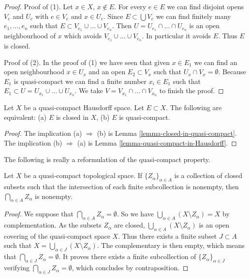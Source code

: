 \begin{proof}
Proof of (1). Let $x \in X$, $x \not \in E$.
For every $e \in E$ we can find disjoint opens $V_e$ and $U_e$
with $e \in V_e$ and $x \in U_e$. Since $E \subset \bigcup V_e$
we can find finitely many $e_1, \ldots, e_n$ such that
$E \subset V_{e_1} \cup \ldots \cup V_{e_n}$. Then
$U = U_{e_1} \cap \ldots \cap U_{e_n}$ is an open neighbourhood
of $x$ which avoids $V_{e_1} \cup \ldots \cup V_{e_n}$. In particular
it avoids $E$. Thus $E$ is closed.

\medskip\noindent
Proof of (2). In the proof of (1) we have seen that given $x \in E_1$
we can find an open neighbourhood $x \in U_x$ and an open
$E_2 \subset V_x$ such that $U_x \cap V_x = \emptyset$. Because
$E_1$ is quasi-compact we can find a finite number $x_i \in E_1$
such that $E_1 \subset U = U_{x_1} \cup \ldots \cup U_{x_n}$.
We take $V = V_{x_1} \cap \ldots \cap V_{x_n}$ to finish the proof.
\end{proof}

\begin{lemma}
\label{lemma-closed-in-compact}
Let $X$ be a quasi-compact Hausdorff space. Let $E \subset X$.
The following are equivalent: (a) $E$ is closed in $X$, (b)
$E$ is quasi-compact.
\end{lemma}

\begin{proof}
The implication (a) $\Rightarrow$ (b) is
Lemma \ref{lemma-closed-in-quasi-compact}.
The implication (b) $\Rightarrow$ (a) is
Lemma \ref{lemma-quasi-compact-in-Hausdorff}.
\end{proof}

\noindent
The following is really a reformulation of the
quasi-compact property.

\begin{lemma}
\label{lemma-intersection-closed-in-quasi-compact}
Let $X$ be a quasi-compact topological space.
If $\{Z_\alpha\}_{\alpha \in A}$ is a collection of closed subsets
such that the intersection of each finite subcollection
is nonempty, then $\bigcap_{\alpha \in A} Z_\alpha$ is nonempty.
\end{lemma}

\begin{proof}
We suppose that $\bigcap_{\alpha \in A} Z_{\alpha} = \emptyset$.
So we have $\bigcup_{\alpha \in A} (X\setminus Z_{\alpha})=X$ by
complementation. As the subsets $Z_\alpha$ are closed,
$\bigcup_{\alpha \in A} (X \setminus Z_{\alpha})$
is an open covering of the quasi-compact space $X$.
Thus there exists a finite subset $J \subset A$ such that
$X = \bigcup_{\alpha \in J} (X\setminus Z_{\alpha})$.
The complementary is then empty, which means that
$\bigcap_{\alpha \in J} Z_{\alpha} = \emptyset$. It proves there exists a
finite subcollection of $\{Z_{\alpha}\}_{\alpha \in J}$ verifying
$\bigcap_{\alpha \in J} Z_{\alpha}=\emptyset$, which concludes by
contraposition.
\end{proof}

